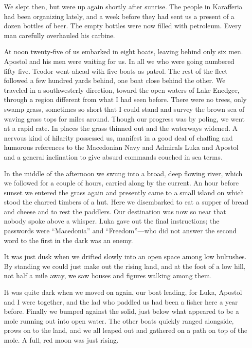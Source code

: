 \documentclass[a5paper,12pt]{book}
\begin{document}
We slept then, but were up again shortly after sunrise. The people in Karafferia had been organizing lately, and a week before they had sent us a present of a dozen bottles of beer. The empty bottles were now filled with petroleum. Every man carefully overhauled his carbine. 

At noon twenty-five of us embarked in eight boats, leaving behind only six men. Apostol and his men were waiting for us. In all we who were going numbered fifty-five. Teodor went ahead with five boats as patrol. The rest of the fleet followed a few hundred yards behind, one boat close behind the other. We traveled in a southwesterly direction, toward the open waters of Lake Enedgee, through a region different from what I had seen before. There were no trees, only swamp grass, sometimes so short that I could stand and survey the brown sea of waving grass tops for miles around. Though our progress was by poling, we went at a rapid rate. In places the grass thinned out and the waterways widened. A nervous kind of hilarity possessed us, manifest in a good deal of chaffing and humorous references to the Macedonian Navy and Admirals Luka and Apostol and a general inclination to give absurd commands couched in sea terms. 

In the middle of the afternoon we swung into a broad, deep flowing river, which we followed for a couple of hours, carried along by the current. An hour before sunset we entered the grass again and presently came to a small island on which stood the charred timbers of a hut. Here we disembarked to eat a supper of bread and cheese and to rest the paddlers. Our destination was now so near that nobody spoke above a whisper. Luka gave out the final instructions; the passwords were “Macedonia” and “Freedom”—who did not answer the second word to the first in the dark was an enemy. 

It was just dusk when we drifted slowly into an open space among low bulrushes. By standing we could just make out the rising land, and at the foot of a low hill, not half a mile away, we saw houses and figures walking among them. 

It was quite dark when we moved on again, our boat leading, for Luka, Apostol and I were together, and the lad who paddled us had been a fisher here a year before. Finally we bumped against the solid, just below what appeared to be a mole running out into open water. The other boats quickly ranged alongside, prows on to the land, and we all leaped out and gathered on a path on top of the mole. A full, red moon was just rising. 
\end{document}
